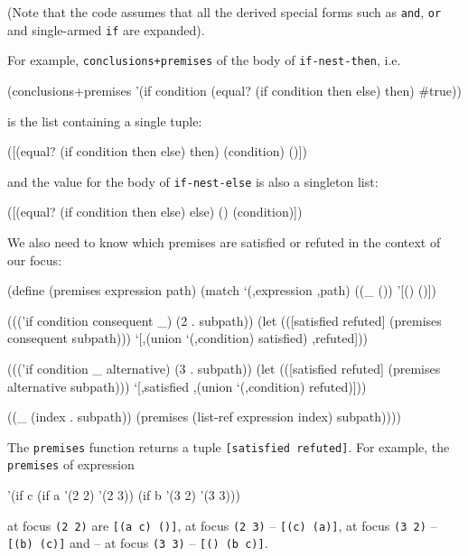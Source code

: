(Note that the code assumes that all the derived special forms such as
\texttt{and}, \texttt{or} and single-armed \texttt{if} are
expanded).

For example, \texttt{conclusions+premises} of the body of
\texttt{if-nest-then}, i.e.

\begin{Snippet}
  (conclusions+premises
   '(if condition
        (equal? (if condition then else) then)
        #true))
\end{Snippet}

is the list containing a single tuple:

\begin{Snippet}
  ([(equal? (if condition then else) then) (condition) ()])
\end{Snippet}

and the value for the body of \texttt{if-nest-else} is also
a singleton list:

\begin{Snippet}
  ([(equal? (if condition then else) else) () (condition)])
\end{Snippet}

We also need to know which premises are satisfied or refuted
in the context of our focus:

\begin{Snippet}
  (define (premises expression path)
    (match `(,expression ,path)
      ((_ ())
       '[() ()])
    
      ((('if condition consequent _) (2 . subpath))
       (let (([satisfied refuted] (premises consequent subpath)))
         `[,(union `(,condition) satisfied) ,refuted]))
    
      ((('if condition _ alternative) (3 . subpath))
       (let (([satisfied refuted] (premises alternative subpath)))
         `[,satisfied ,(union `(,condition) refuted)]))
    
      ((_ (index . subpath))
       (premises (list-ref expression index) subpath))))
\end{Snippet}

The \texttt{premises} function returns a tuple \texttt{[satisfied refuted]}.
For example, the \texttt{premises} of expression

\begin{Snippet}
  '(if c
       (if a
           '(2 2)
           '(2 3))
       (if b
           '(3 2)
           '(3 3)))
\end{Snippet}

at focus \texttt{(2 2)} are \texttt{[(a c) ()]}, at focus \texttt{(2 3)}
-- \texttt{[(c) (a)]}, at focus \texttt{(3 2)} -- \texttt{[(b) (c)]} and
-- at focus \texttt{(3 3)} -- \texttt{[() (b c)]}.

